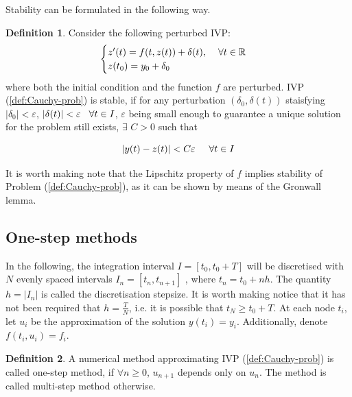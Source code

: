 \documentclass[11pt]{article}
\theoremstyle{theorem}
\theoremstyle{definition}
\newtheorem{definition}{Definition}
\begin{document}
Stability can be formulated in the following way.

\begin{definition}
	\label{def:stability}
	Consider the following perturbed IVP:
	\begin{align}
	\label{eqn:pert-prob}
	\begin{cases}
	z'(t)=f(t,z(t))+\delta(t),\hspace{4mm}\forall t\in\mathbb{R}\\
	z(t_0)=y_0+\delta_0
	\end{cases}
	\end{align}
	where both the initial condition and the function $f$ are perturbed. IVP (\ref{def:Cauchy-prob}) is stable, if for any perturbation $(\delta_0, \delta(t))$ staisfying $|\delta_0|<\varepsilon$, $|\delta(t)|<\varepsilon\hspace{3mm}\forall t\in I$, $\varepsilon$ being small enough to guarantee a unique solution for the problem still exists, $\exists$ $C>0$ such that 
	
	$$|y(t)-z(t)|<C\varepsilon\hspace{5mm}\forall t\in I$$ 
\end{definition}

It is worth making note that the Lipschitz property of $f$ implies stability of Problem (\ref{def:Cauchy-prob}), as it can be shown by means of the Gronwall lemma.\\

\subsection{One-step methods}
In the following, the integration interval $I=[t_0, t_0+T]$ will be discretised with $N$ evenly spaced intervals $I_n=[t_n, t_{n+1}]$ , where $t_n=t_0+nh$. The quantity $h=|I_n|$ is called the discretisation stepsize. It is worth making notice that it has not been required that $h=\frac{T}{N}$, i.e. it is possible that $t_N\ge t_0 + T$.
At each node $t_i$, let $u_i$ be the approximation of the solution $y(t_i)=y_i$. Additionally, denote $f(t_i,u_i)=f_i$.\\

\begin{definition}
	\label{def:One-step-method}
	A numerical method approximating IVP (\ref{def:Cauchy-prob}) is called one-step method, if $\forall n\ge 0$, $u_{n+1}$ depends only on $u_n$. The method is called multi-step method otherwise.
\end{definition}
\end{document}
